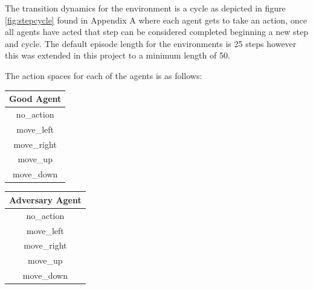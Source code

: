 \documentclass{article}
\begin{document}
The transition dynamics for the environment is a cycle as depicted in figure \ref{fig:stepcycle} found in Appendix A where each agent gets to take an action, once all agents have acted that step can be considered completed beginning a new step and cycle.
The default episode length for the environments is 25 steps however this was extended in this project to a minimum length of 50.

The action spaces for each of the agents is as follows:




\begin{minipage}[c]{.5\linewidth}
  \centering
  \begin{tabular}{|c|}
  \hline
  Good Agent  \\ \hline
  no\_action  \\ \hline
  move\_left  \\ \hline
  move\_right \\ \hline
  move\_up    \\ \hline
  move\_down  \\ \hline
  \end{tabular}
\end{minipage}
\begin{minipage}[c]{.5\linewidth}
  \centering
  \begin{tabular}{|c|}
    \hline
    Adversary Agent  \\ \hline
    no\_action  \\ \hline
    move\_left  \\ \hline
    move\_right \\ \hline
    move\_up    \\ \hline
    move\_down  \\ \hline
    \end{tabular}

\end{minipage}
\end{document}
